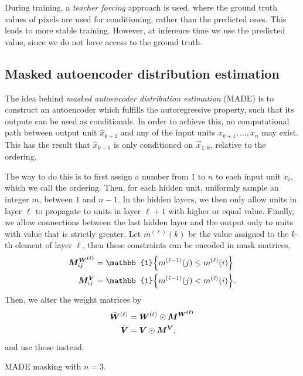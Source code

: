 During training, a \textit{teacher forcing} approach is used, where the ground truth values of
pixels are used for conditioning, rather than the predicted ones. This leads to more stable
training. However, at inference time we use the predicted value, since we do not have access to the
ground truth.

\subsection{Masked autoencoder distribution estimation}

The idea behind \textit{masked autoencoder distribution estimation} (MADE) \citep{germain2015made}
is to construct an autoencoder which fulfills the autoregressive property, such that its outputs
can be used as conditionals. In order to achieve this, no computational path between output unit
$\hat{x}_{k+1}$ and any of the input units $x_{k+1}, \ldots, x_n$ may exist. This has the result
that $\hat{x}_{k+1}$ is only conditioned on $\vec{x}_{1:k}$, relative to the ordering.

The way to do this is to first assign a number from $1$ to $n$ to each input unit $x_i$, which we
call the ordering. Then, for each hidden unit, uniformly sample an integer $m$, between $1$ and
$n-1$. In the hidden layers, we then only allow units in layer $\ell$ to propagate to units in
layer $\ell+1$ with higher or equal value. Finally, we allow connections between the last hidden
layer and the output only to units with value that is strictly greater. Let $m^{(\ell)}(k)$ be the
value assigned to the $k$-th element of layer $\ell$, then these constraints can be encoded in mask
matrices,
\begin{align*}
    \mat{M}^{\mat{W^{(\ell)}}}_{ij} & = \mathbb{1}\lft\{ m^{(\ell-1)}(j) \leq m^{(\ell)}(i) \rgt\} \\
    \mat{M}^{\mat{V}}_{ij}          & = \mathbb{1}\lft\{ m^{(\ell-1)}(j) < m^{(\ell)}(i) \rgt\}.
\end{align*}
Then, we alter the weight matrices by
\begin{align*}
    \bar{\bm{W}}^{(\ell)} & = \bm{W}^{(\ell)} \odot \bm{M}^{\bm{W^{(\ell)}}} \\
    \bar{\bm{V}}          & = \bm{V} \odot \bm{M}^{\bm{V}},
\end{align*}
and use those instead.

\begin{marginfigure}[-7cm]
    \centering
    \caption{MADE masking with $n=3$.}
    \label{fig:made-masking}
\end{marginfigure}

